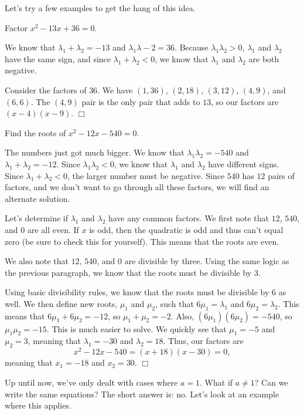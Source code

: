 \documentclass[../book.tex]{subfiles}
\begin{document}
Let's try a few examples to get the hang of this idea.
\begin{example}
Factor $x^2-13x+36=0$.
\end{example}
\begin{solution}
We know that $\lambda_1+\lambda_2=-13$ and $\lambda_1\lambda-2=36$.  Because $\lambda_1\lambda_2>0$, $\lambda_1$ and $\lambda_2$ have the same sign, and since $\lambda_1+\lambda_2<0$, we know that $\lambda_1$ and $\lambda_2$ are both negative.

Consider the factors of $36$.  We have $(1,36)$, $(2,18)$, $(3,12)$, $(4,9)$, and $(6,6)$.  The $(4,9)$ pair is the only pair that adds to $13$, so our factors are $(x-4)(x-9)$.  $\Box$ 
\end{solution}
\begin{example}
Find the roots of $x^2-12x-540=0$.
\end{example}
\begin{solution}
The numbers just got much bigger.  We know that $\lambda_1\lambda_2=-540$ and $\lambda_1+\lambda_2=-12$.  Since $\lambda_1\lambda_2<0$, we know that $\lambda_1$ and $\lambda_2$ have different signs.  Since $\lambda_1+\lambda_2<0$, the larger number must be negative.  Since $540$ has $12$ pairs of factors, and we don't want to go through all these factors, we will find an alternate solution.

Let's determine if $\lambda_1$ and $\lambda_2$ have any common factors.  We first note that $12$, $540$, and $0$ are all even.  If $x$ is odd, then the quadratic is odd and thus can't equal zero (be sure to check this for yourself).  This means that the roots are even.

We also note that $12$, $540$, and $0$ are divisible by three.  Using the same logic as the previous paragraph, we know that the roots must be divisible by $3$.

Using basic divisibility rules, we know that the roots must be divisible by $6$ as well.  We then define new roots, $\mu_1$ and $\mu_2$, such that $6\mu_1=\lambda_1$ and $6\mu_2=\lambda_2$.  This means that $6\mu_1+6\mu_2=-12$, so $\mu_1+\mu_2=-2$.  Also, $\left(6\mu_1\right)\left(6\mu_2\right)=-540$, so $\mu_1\mu_2=-15$.  This is much easier to solve.  We quickly see that $\mu_1=-5$ and $\mu_2=3$, meaning that $\lambda_1=-30 $ and $\lambda_2=18$.  Thus, our factors are $$x^2-12x-540=(x+18)(x-30)=0,$$ meaning that $x_1=-18$ and $x_2=30$.  $\Box$
\end{solution}
Up until now, we've only dealt with cases where $a=1$.  What if $a\neq 1$?  Can we write the same equations?  The short answer is: no.  Let's look at an example where this applies.
\end{document}

